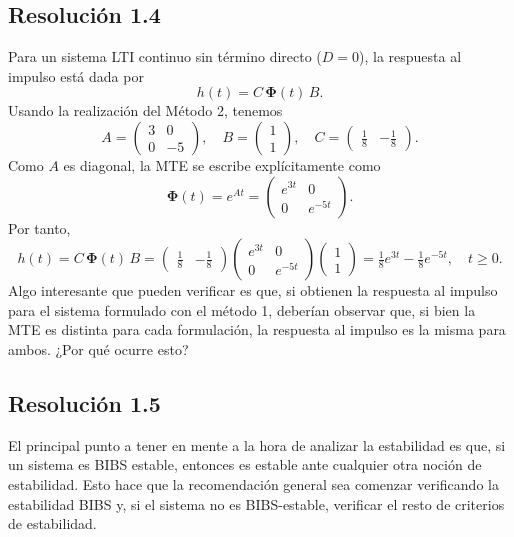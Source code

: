 \documentclass[
  11pt,
  letterpaper,
   addpoints,
   answers
  ]{exam}
\begin{document}
\begin{questions}
\begin{solution}
\subsection*{Resolución 1.4}
Para un sistema LTI continuo sin término directo ($D=0$), la respuesta al impulso está dada por
\begin{equation}
  h(t) = C\,\boldsymbol{\Phi}(t)\,B.
\end{equation}
Usando la realización del Método 2, tenemos
\[
  A=\begin{pmatrix}3&0\\0&-5\end{pmatrix},\quad
  B=\begin{pmatrix}1\\[2pt]1\end{pmatrix},\quad
  C=\begin{pmatrix}\tfrac{1}{8} & -\tfrac{1}{8}\end{pmatrix}.
\]
Como $A$ es diagonal, la MTE se escribe explícitamente como
\begin{equation}
  \boldsymbol{\Phi}(t)=e^{At}=\begin{pmatrix} e^{3t} & 0 \\ 0 & e^{-5t} \end{pmatrix}.
\end{equation}
Por tanto,
\begin{equation}
  h(t) 
  = C\,\boldsymbol{\Phi}(t)\,B
  = \begin{pmatrix}\tfrac{1}{8} & -\tfrac{1}{8}\end{pmatrix}
    \begin{pmatrix} e^{3t} & 0 \\ 0 & e^{-5t} \end{pmatrix}
    \begin{pmatrix} 1 \\[2pt] 1 \end{pmatrix}
  = \tfrac{1}{8}e^{3t} - \tfrac{1}{8}e^{-5t},\quad t\ge 0.
\end{equation}
Algo interesante que pueden verificar es que, si obtienen la respuesta al impulso para el sistema formulado con el método 1, deberían observar que, si bien la MTE es distinta para cada formulación, la respuesta al impulso es la misma para ambos. ¿Por qué ocurre esto?
\subsection*{Resolución 1.5}
El principal punto a tener en mente a la hora de analizar la estabilidad es que, si un sistema es BIBS estable, entonces es estable ante cualquier otra noción de estabilidad. Esto hace que la recomendación general sea comenzar verificando la estabilidad BIBS y, si el sistema no es BIBS-estable, verificar el resto de criterios de estabilidad.


\end{solution}
\end{questions}
\end{document}
